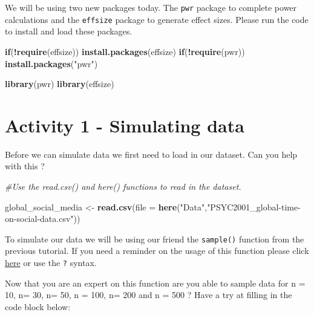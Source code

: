 \documentclass[
]{book}
\newenvironment{Shaded}{\begin{snugshade}}{\end{snugshade}}
\newcommand{\AttributeTok}[1]{\textcolor[rgb]{0.13,0.29,0.53}{#1}}
\newcommand{\CommentTok}[1]{\textcolor[rgb]{0.56,0.35,0.01}{\textit{#1}}}
\newcommand{\ControlFlowTok}[1]{\textcolor[rgb]{0.13,0.29,0.53}{\textbf{#1}}}
\newcommand{\FunctionTok}[1]{\textcolor[rgb]{0.13,0.29,0.53}{\textbf{#1}}}
\newcommand{\NormalTok}[1]{#1}
\newcommand{\OtherTok}[1]{\textcolor[rgb]{0.56,0.35,0.01}{#1}}
\newcommand{\SpecialCharTok}[1]{\textcolor[rgb]{0.81,0.36,0.00}{\textbf{#1}}}
\newcommand{\StringTok}[1]{\textcolor[rgb]{0.31,0.60,0.02}{#1}}
\begin{document}
We will be using two new packages today. The \texttt{pwr} package to complete power calculations and the \texttt{effsize} package to generate effect sizes. Please run the code to install and load these packages.

\begin{Shaded}
\begin{Highlighting}[]
\ControlFlowTok{if}\NormalTok{(}\SpecialCharTok{!}\FunctionTok{require}\NormalTok{(effsize)) }\FunctionTok{install.packages}\NormalTok{(}\StringTok{\textquotesingle{}effsize\textquotesingle{}}\NormalTok{)}
\ControlFlowTok{if}\NormalTok{(}\SpecialCharTok{!}\FunctionTok{require}\NormalTok{(pwr)) }\FunctionTok{install.packages}\NormalTok{(}\StringTok{"pwr"}\NormalTok{)}

\FunctionTok{library}\NormalTok{(pwr)}
\FunctionTok{library}\NormalTok{(effsize)}
\end{Highlighting}
\end{Shaded}

\section{Activity 1 - Simulating data}\label{activity-1---simulating-data}

Before we can simulate data we first need to load in our dataset. Can you help with this ?

\begin{Shaded}
\begin{Highlighting}[]
\CommentTok{\#Use the read.csv() and here() functions to read in the dataset.}

\NormalTok{global\_social\_media }\OtherTok{\textless{}{-}} \FunctionTok{read.csv}\NormalTok{(}\AttributeTok{file =} \FunctionTok{here}\NormalTok{(}\StringTok{"Data"}\NormalTok{,}\StringTok{"PSYC2001\_global{-}time{-}on{-}social{-}data.csv"}\NormalTok{))}
\end{Highlighting}
\end{Shaded}

To simulate our data we will be using our friend the \texttt{sample()} function from the previous tutorial. If you need a reminder on the usage of this function please click \hyperref[vectors-and-the-sample-function]{here} or use the \texttt{?} syntax.

Now that you are an expert on this function are you able to sample data for n = 10, n= 30, n= 50, n = 100, n= 200 and n = 500 ? Have a try at filling in the code block below:
\end{document}

